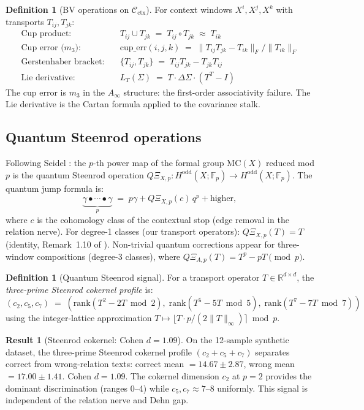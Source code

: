 \documentclass[11pt]{amsart}
\theoremstyle{definition}
\newtheorem{definition}[theorem]{Definition}
\newtheorem{result}[theorem]{Result}
\newcommand{\Cctx}{\mathcal{C}_{\!\mathrm{ctx}}}
\begin{document}
\begin{definition}[BV operations on $\Cctx$]
For context windows $X^i, X^j, X^k$ with transports $T_{ij}, T_{jk}$:
\begin{align*}
\text{Cup product:}\quad & T_{ij} \cup T_{jk} \;=\; T_{ij} \circ T_{jk} \;\approx\; T_{ik}\\
\text{Cup error ($m_3$):}\quad & \mathrm{cup\_err}(i,j,k) \;=\; \|T_{ij} T_{jk} - T_{ik}\|_F / \|T_{ik}\|_F\\
\text{Gerstenhaber bracket:}\quad & \{T_{ij}, T_{jk}\} \;=\; T_{ij}T_{jk} - T_{jk}T_{ij}\\
\text{Lie derivative:}\quad & L_T(\Sigma) \;=\; T \cdot \Delta\Sigma \cdot (T^T - I)
\end{align*}
The cup error is $m_3$ in the $A_\infty$ structure: the first-order associativity failure.
The Lie derivative is the Cartan formula applied to the covariance stalk.
\end{definition}

\subsection{Quantum Steenrod operations}

Following Seidel \cite{Seidel23}: the $p$-th power map of the formal group $\mathrm{MC}(X)$
reduced mod $p$ is the quantum Steenrod operation
$Q\Xi_{X,p}: H^{\mathrm{odd}}(X;\mathbb{F}_p) \to H^{\mathrm{odd}}(X;\mathbb{F}_p)$.
The quantum jump formula is:
\[
  \underbrace{\gamma \bullet \cdots \bullet \gamma}_{p} \;=\; p\gamma + Q\Xi_{X,p}(c)\,q^p + \text{higher},
\]
where $c$ is the cohomology class of the contextual stop (edge removal in the relation nerve).
For degree-1 classes (our transport operators): $Q\Xi_{X,p}(T) = T$ (identity, Remark~1.10
of \cite{Seidel23}).
Non-trivial quantum corrections appear for three-window compositions (degree-3 classes),
where $Q\Xi_{A,p}(T) = T^p - pT \pmod{p}$.

\begin{definition}[Quantum Steenrod signal]
For a transport operator $T \in \mathbb{R}^{d \times d}$, the
\emph{three-prime Steenrod cokernel profile} is:
\[
  (c_2, c_5, c_7) \;=\; (\mathrm{rank}(T^2-2T\bmod 2),\; \mathrm{rank}(T^5-5T\bmod 5),\;
  \mathrm{rank}(T^7-7T\bmod 7))
\]
using the integer-lattice approximation $T \mapsto \lfloor T \cdot p/(2\|T\|_\infty)\rceil \bmod p$.
\end{definition}

\begin{result}[Steenrod cokernel: Cohen $d = 1.09$]
\label{result:steenrod}
On the 12-sample synthetic dataset, the three-prime Steenrod cokernel profile
$(c_2+c_5+c_7)$ separates correct from wrong-relation texts:
correct mean $= 14.67 \pm 2.87$, wrong mean $= 17.00 \pm 1.41$.
Cohen $d = 1.09$.
The cokernel dimension $c_2$ at $p=2$ provides the dominant discrimination
(ranges 0--4) while $c_5, c_7 \approx 7$--$8$ uniformly.
This signal is independent of the relation nerve and Dehn gap.
\end{result}
\end{document}
